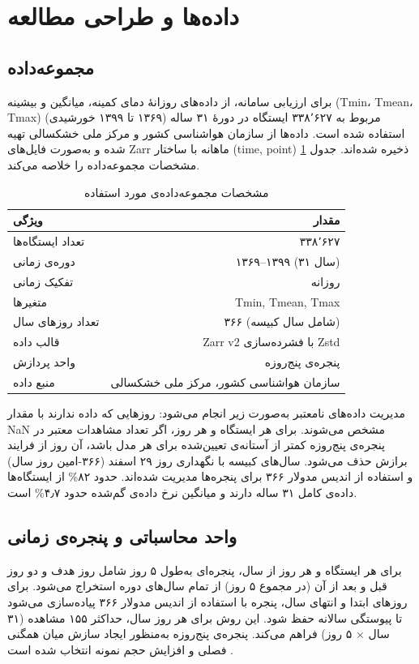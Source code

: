 \documentclass[12pt,a4paper,twocolumn]{article}
\begin{document}
\section{داده‌ها و طراحی مطالعه}

\subsection{مجموعه‌داده}
برای ارزیابی سامانه، از داده‌های روزانهٔ دمای کمینه، میانگین و بیشینه (Tmin، Tmean، Tmax) مربوط به ۳۳۸٬۶۲۷ ایستگاه در دورهٔ ۳۱ ساله (۱۳۶۹ تا ۱۳۹۹ خورشیدی) استفاده شده است. داده‌ها از سازمان هواشناسی کشور و مرکز ملی خشکسالی تهیه شده و به‌صورت فایل‌های Zarr ماهانه با ساختار (time, point) ذخیره شده‌اند. جدول \ref{tab:dataset} مشخصات مجموعه‌داده را خلاصه می‌کند.

\begin{table}[h]
\centering
\caption{مشخصات مجموعه‌داده‌ی مورد استفاده}
\label{tab:dataset}
\begin{tabular}{l r}
\toprule
\textbf{ویژگی} & \textbf{مقدار} \\
\midrule
تعداد ایستگاه‌ها & ۳۳۸٬۶۲۷ \\
دوره‌ی زمانی & ۱۳۶۹–۱۳۹۹ (۳۱ سال) \\
تفکیک زمانی & روزانه \\
متغیرها & Tmin, Tmean, Tmax \\
تعداد روزهای سال & ۳۶۶ (شامل سال کبیسه) \\
قالب داده & Zarr v2 با فشرده‌سازی Zstd \\
واحد پردازش & پنجره‌ی پنج‌روزه \\
منبع داده & سازمان هواشناسی کشور، مرکز ملی خشکسالی \\
\bottomrule
\end{tabular}
\end{table}

مدیریت داده‌های نامعتبر به‌صورت زیر انجام می‌شود: روزهایی که داده ندارند با مقدار NaN مشخص می‌شوند. برای هر ایستگاه و هر روز، اگر تعداد مشاهدات معتبر در پنجره‌ی پنج‌روزه کمتر از آستانه‌ی تعیین‌شده برای هر مدل باشد، آن روز از فرایند برازش حذف می‌شود. سال‌های کبیسه با نگهداری روز ۲۹ اسفند (۳۶۶-امین روز سال) و استفاده از اندیس مدولار ۳۶۶ برای پنجره‌ها مدیریت شده‌اند. حدود ۸۲\% از ایستگاه‌ها داده‌ی کامل ۳۱ ساله دارند و میانگین نرخ داده‌ی گم‌شده حدود ۴٫۷\% است.

\subsection{واحد محاسباتی و پنجره‌ی زمانی}
برای هر ایستگاه و هر روز از سال، پنجره‌ای به‌طول ۵ روز شامل روز هدف و دو روز قبل و بعد از آن (در مجموع ۵ روز) از تمام سال‌های دوره استخراج می‌شود. برای روزهای ابتدا و انتهای سال، پنجره با استفاده از اندیس مدولار ۳۶۶ پیاده‌سازی می‌شود تا پیوستگی سالانه حفظ شود. این روش برای هر روز سال، حداکثر ۱۵۵ مشاهده (۳۱ سال × ۵ روز) فراهم می‌کند. پنجره‌ی پنج‌روزه به‌منظور ایجاد سازش میان همگنی فصلی و افزایش حجم نمونه انتخاب شده است \cite{burnham2002}.
\end{document}
